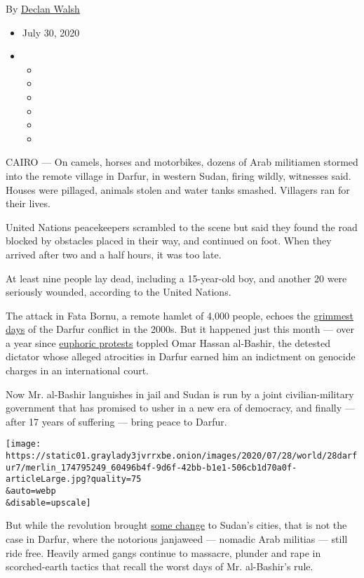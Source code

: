 By \href{https://www.nytimes3xbfgragh.onion/by/declan-walsh}{Declan
Walsh}

\begin{itemize}
\item
  July 30, 2020
\item
  \begin{itemize}
  \item
  \item
  \item
  \item
  \item
  \item
  \end{itemize}
\end{itemize}

CAIRO --- On camels, horses and motorbikes, dozens of Arab militiamen
stormed into the remote village in Darfur, in western Sudan, firing
wildly, witnesses said. Houses were pillaged, animals stolen and water
tanks smashed. Villagers ran for their lives.

United Nations peacekeepers scrambled to the scene but said they found
the road blocked by obstacles placed in their way, and continued on
foot. When they arrived after two and a half hours, it was too late.

At least nine people lay dead, including a 15-year-old boy, and another
20 were seriously wounded, according to the United Nations.

The attack in Fata Bornu, a remote hamlet of 4,000 people, echoes the
\href{https://www.nytimes3xbfgragh.onion/2005/02/23/opinion/the-secret-genocide-archive.html}{grimmest
days} of the Darfur conflict in the 2000s. But it happened just this
month --- over a year since
\href{https://www.nytimes3xbfgragh.onion/2019/04/23/world/africa/sudan-protesters-al-bashir-abdelkhalig-.html}{euphoric
protests} toppled Omar Hassan al-Bashir, the detested dictator whose
alleged atrocities in Darfur earned him an indictment on genocide
charges in an international court.

Now Mr. al-Bashir languishes in jail and Sudan is run by a joint
civilian-military government that has promised to usher in a new era of
democracy, and finally --- after 17 years of suffering --- bring peace
to Darfur.

\texttt{[image: https://static01.graylady3jvrrxbe.onion/images/2020/07/28/world/28darfur7/merlin\_174795249\_60496b4f-9d6f-42bb-b1e1-506cb1d70a0f-articleLarge.jpg?quality=75\\\&auto=webp\\\&disable=upscale]}

But while the revolution brought
\href{https://www.nytimes3xbfgragh.onion/2020/07/13/world/africa/sudan-fgm-alcohol-flogging.html}{some
change} to Sudan's cities, that is not the case in Darfur, where the
notorious janjaweed --- nomadic Arab militias --- still ride free.
Heavily armed gangs continue to massacre, plunder and rape in
scorched-earth tactics that recall the worst days of Mr. al-Bashir's
rule.

